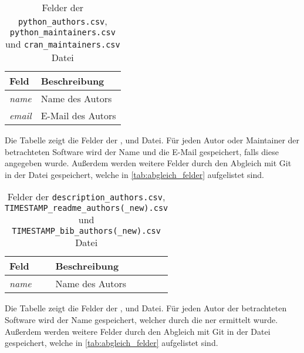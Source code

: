 \begin{table}
    \centering
    \begin{tabularx}{\textwidth}{XL{10.2cm}}
        \toprule
        \textbf{Feld} & \textbf{Beschreibung} \\ \midrule
        \emph{name}   & Name des Autors       \\
        \emph{email}  & E-Mail des Autors     \\
        \bottomrule
    \end{tabularx}
    \caption{Felder der \texttt{python\_authors.csv}, \texttt{python\_maintainers.csv} und \texttt{cran\_maintainers.csv} Datei}
    \label{tab:python_authors}
    \small
    \raggedright
    Die Tabelle zeigt die Felder der ,  und  Datei. Für jeden Autor oder Maintainer der betrachteten Software wird der Name und die E-Mail gespeichert, falls diese angegeben wurde. Außerdem werden weitere Felder durch den Abgleich mit Git in der Datei gespeichert, welche in \autoref{tab:abgleich_felder} aufgelistet sind.
\end{table}

\begin{table}
    \centering
    \begin{tabularx}{\textwidth}{XL{10.2cm}}
        \toprule
        \textbf{Feld} & \textbf{Beschreibung} \\ \midrule
        \emph{name}   & Name des Autors       \\
        \bottomrule
    \end{tabularx}
    \caption{Felder der \texttt{description\_authors.csv}, \texttt{TIMESTAMP\_readme\_authors(\_new).csv} und \texttt{TIMESTAMP\_bib\_authors(\_new).csv} Datei}
    \label{tab:description_authors}
    \small
    \raggedright
    Die Tabelle zeigt die Felder der ,  und  Datei. Für jeden Autor der betrachteten Software wird der Name gespeichert, welcher durch die \gls{ner} ermittelt wurde. Außerdem werden weitere Felder durch den Abgleich mit Git in der Datei gespeichert, welche in \autoref{tab:abgleich_felder} aufgelistet sind.
\end{table}

